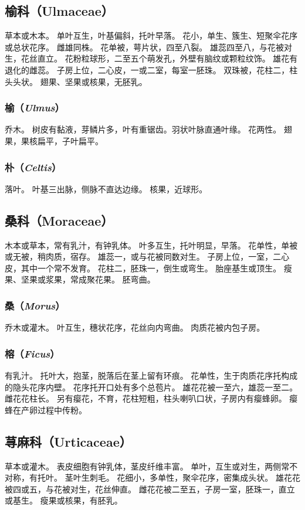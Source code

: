 \documentclass[11pt]{article}
\begin{document}
\begin{sloppypar}
\subsection{榆科（Ulmaceae）}
草本或木本。
单叶互生，叶基偏斜，托叶早落。
花小，单生、簇生、短聚伞花序或总状花序。
雌雄同株。
花单被，萼片状，四至八裂。
雄蕊四至八，与花被对生，花丝直立。
花粉粒球形，二至五个萌发孔，外壁有脑纹或颗粒纹饰。
雄花有退化的雌蕊。
子房上位，二心皮，一或二室，每室一胚珠。
双珠被，花柱二，柱头头状。
翅果、坚果或核果，无胚乳。

\subsubsection{榆（\textit{Ulmus}）}
乔木。
树皮有黏液，芽鳞片多，叶有重锯齿。羽状叶脉直通叶缘。
花两性。
翅果，果核扁平，子叶扁平。

\subsubsection{朴（\textit{Celtis}）}
落叶。
叶基三出脉，侧脉不直达边缘。
核果，近球形。

\subsection{桑科（Moraceae）}
木本或草本，常有乳汁，有钟乳体。
叶多互生，托叶明显，早落。
花单性，单被或无被，稍肉质，宿存。
雄蕊一，或与花被同数对生。
子房上位，一室，二心皮，其中一个常不发育。
花柱二，胚珠一，倒生或弯生。
胎座基生或顶生。
瘦果、坚果或浆果，常成聚花果。
胚弯曲。

\subsubsection{桑（\textit{Morus}）}
乔木或灌木。
叶互生，穗状花序，花丝向内弯曲。
肉质花被内包子房。

\subsubsection{榕（\textit{Ficus}）}
有乳汁。
托叶大，抱茎，脱落后在茎上留有环痕。
花单性，生于肉质花序托构成的隐头花序内壁。
花序托开口处有多个总苞片。
雄花花被一至六，雄蕊一至二。
雌花花柱长。
另有瘿花，不育，花柱短粗，柱头喇叭口状，子房内有瘿蜂卵。
瘿蜂在产卵过程中传粉。

\subsection{荨麻科（Urticaceae）}
草本或灌木。
表皮细胞有钟乳体，茎皮纤维丰富。
单叶，互生或对生，两侧常不对称，有托叶。
茎叶生刺毛。
花细小，多单性，聚伞花序，密集成头状。
雄花花被四或五，与花被对生，花丝伸直。
雌花花被二至五，子房一室，胚珠一，直立或基生。
瘦果或核果，有胚乳。


\end{sloppypar}
\end{document}
